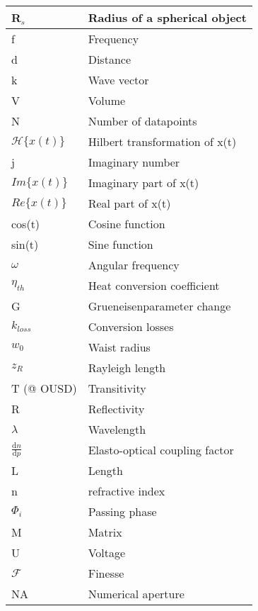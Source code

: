\begin{center}
\begin{longtable}{|  P{3cm} | p{10cm} |  }
    R$_s$ & Radius of a spherical object \\ \hline
    f & Frequency \\ \hline
    d & Distance \\ \hline
    k & Wave vector \\ \hline
    V & Volume \\ \hline
    N & Number of datapoints \\ \hline
    $\mathcal{H}\{x(t)\}$ & Hilbert transformation of x(t) \\ \hline
    j &  Imaginary number \\ \hline 
    $Im\{x(t)\}$ & Imaginary part of x(t) \\ \hline
    $Re\{x(t)\}$ & Real part of x(t) \\ \hline
    cos(t) & Cosine function \\ \hline
    sin(t) & Sine function \\ \hline
    $\omega$ & Angular frequency \\ \hline
    $\eta_{th}$ & Heat conversion coefficient \\ \hline
    G & Grueneisenparameter change \\ \hline
    $k_{loss}$ & Conversion losses \\ \hline
    $w_0$ & Waist radius \\ \hline
    $z_R$ & Rayleigh length \\ \hline
    T (@ OUSD) & Transitivity \\ \hline
    R & Reflectivity \\ \hline
    $\lambda$ & Wavelength \\ \hline
    $\frac{\mathrm{d}n}{\mathrm{d}p}$ & Elasto-optical coupling factor \\ \hline
    L & Length \\ \hline
    n & refractive index \\ \hline
    $\Phi_i$ & Passing phase \\ \hline
    M & Matrix \\ \hline
    U & Voltage \\ \hline
    $\mathcal{F}$ & Finesse \\ \hline
    NA & Numerical aperture \\ \hline 
    \end{longtable}
\end{center}